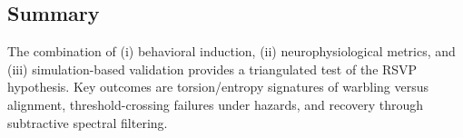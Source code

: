 \documentclass[a4paper,11pt]{article}
\begin{document}
\subsection{Summary}
The combination of (i) behavioral induction, (ii) neurophysiological metrics,
and (iii) simulation-based validation provides a triangulated test of the RSVP
hypothesis. Key outcomes are torsion/entropy signatures of warbling versus
alignment, threshold-crossing failures under hazards, and recovery through
subtractive spectral filtering.




\end{document}
